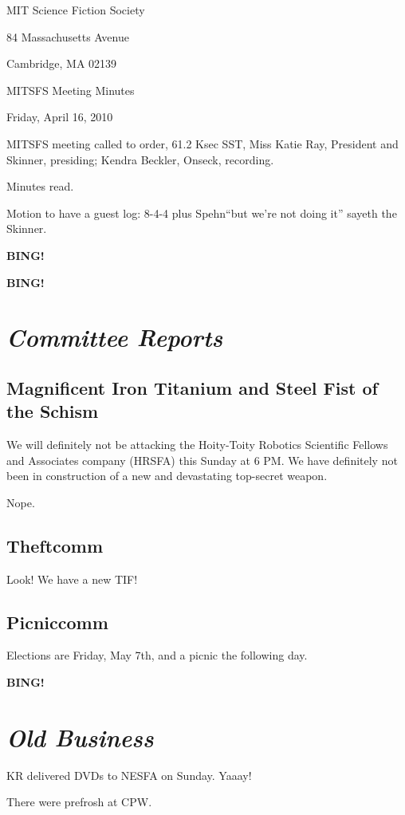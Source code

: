 \documentclass[10pt]{article}
\newcommand{\bing}{{\bf BING!} }
\newcommand{\goto}[1]{\bing \vskip 12pt \section*{{\em{#1}}}}
\newcommand{\ps}{ plus Spehn\xspace}
\newcommand{\skinner}{Miss Katie Ray, President and Skinner}
\newcommand{\onseck}{Kendra Beckler, Onseck}
\newcommand{\meetingdate}{Friday, April 16, 2010}
\begin{document}
\begin{center}

MIT Science Fiction Society

84 Massachusetts Avenue

Cambridge, MA 02139

\vspace{12pt}

MITSFS Meeting Minutes

\meetingdate

\end{center}

\vspace{18pt}

\setlength{\parskip}{6pt}

\noindent
MITSFS meeting called to order, 61.2 Ksec SST,
\skinner, presiding; \onseck, recording.

Minutes read.

Motion to have a guest log: 8-4-4 \ps ``but we're not doing it'' sayeth the 
Skinner.

\bing

\goto{Committee Reports}

\subsection*{Magnificent Iron Titanium and Steel Fist of the Schism}

We will definitely not be attacking the Hoity-Toity Robotics Scientific
Fellows and Associates company (HRSFA) this Sunday at 6 PM.  We have definitely
not been in construction of a new and devastating top-secret weapon.

Nope.

\subsection*{Theftcomm}

Look!  We have a new TIF!

\subsection*{Picniccomm}

Elections are Friday, May 7th, and a picnic the following day.

\goto{Old Business}

KR delivered DVDs to NESFA on Sunday.  Yaaay!

There were prefrosh at CPW.
\end{document}
